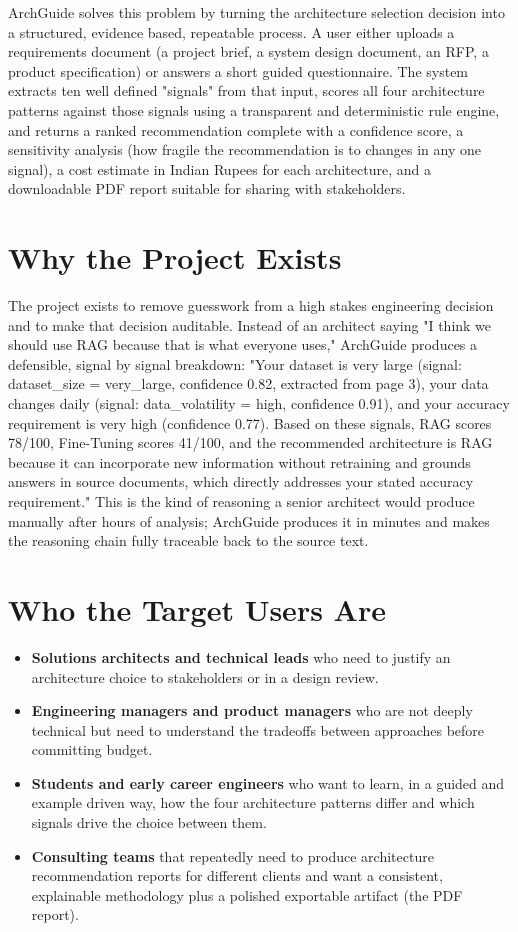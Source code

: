 \documentclass[11pt,a4paper]{report}
\begin{document}
ArchGuide solves this problem by turning the architecture selection decision into a structured, evidence based, repeatable process. A user either uploads a requirements document (a project brief, a system design document, an RFP, a product specification) or answers a short guided questionnaire. The system extracts ten well defined "signals" from that input, scores all four architecture patterns against those signals using a transparent and deterministic rule engine, and returns a ranked recommendation complete with a confidence score, a sensitivity analysis (how fragile the recommendation is to changes in any one signal), a cost estimate in Indian Rupees for each architecture, and a downloadable PDF report suitable for sharing with stakeholders.

\section{Why the Project Exists}

The project exists to remove guesswork from a high stakes engineering decision and to make that decision auditable. Instead of an architect saying "I think we should use RAG because that is what everyone uses," ArchGuide produces a defensible, signal by signal breakdown: "Your dataset is very large (signal: dataset\_size = very\_large, confidence 0.82, extracted from page 3), your data changes daily (signal: data\_volatility = high, confidence 0.91), and your accuracy requirement is very high (confidence 0.77). Based on these signals, RAG scores 78/100, Fine-Tuning scores 41/100, and the recommended architecture is RAG because it can incorporate new information without retraining and grounds answers in source documents, which directly addresses your stated accuracy requirement." This is the kind of reasoning a senior architect would produce manually after hours of analysis; ArchGuide produces it in minutes and makes the reasoning chain fully traceable back to the source text.

\section{Who the Target Users Are}

\begin{itemize}[leftmargin=*]
  \item \textbf{Solutions architects and technical leads} who need to justify an architecture choice to stakeholders or in a design review.
  \item \textbf{Engineering managers and product managers} who are not deeply technical but need to understand the tradeoffs between approaches before committing budget.
  \item \textbf{Students and early career engineers} who want to learn, in a guided and example driven way, how the four architecture patterns differ and which signals drive the choice between them.
  \item \textbf{Consulting teams} that repeatedly need to produce architecture recommendation reports for different clients and want a consistent, explainable methodology plus a polished exportable artifact (the PDF report).
\end{itemize}
\end{document}
